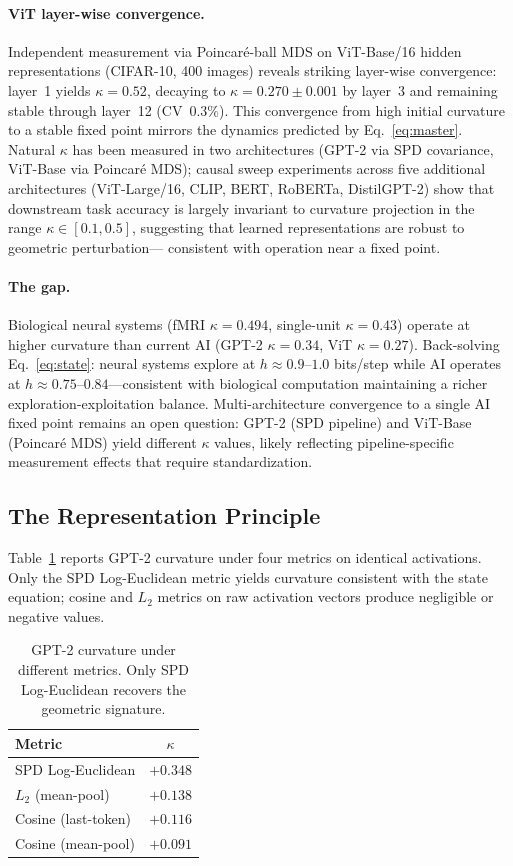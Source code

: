 \documentclass[letterpaper]{article}
\begin{document}
\paragraph{ViT layer-wise convergence.}
Independent measurement via Poincar\'{e}-ball MDS on
ViT-Base/16 hidden representations (CIFAR-10, 400
images) reveals striking layer-wise convergence:
layer~1 yields $\kappa=0.52$, decaying to
$\kappa=0.270\pm0.001$ by layer~3 and remaining
stable through layer~12 (CV~$0.3\%$).
This convergence from high initial curvature to a
stable fixed point mirrors the dynamics predicted by
Eq.~\eqref{eq:master}.
Natural $\kappa$ has been measured in two architectures
(GPT-2 via SPD covariance, ViT-Base via Poincar\'{e}
MDS); causal sweep experiments across five additional
architectures (ViT-Large/16, CLIP, BERT, RoBERTa,
DistilGPT-2) show that downstream task accuracy
is largely invariant to curvature projection in the
range $\kappa\in[0.1, 0.5]$, suggesting that learned
representations are robust to geometric perturbation---
consistent with operation near a fixed point.

\paragraph{The gap.}
Biological neural systems (fMRI $\kappa=0.494$,
single-unit $\kappa=0.43$) operate at
higher curvature than current AI
(GPT-2 $\kappa=0.34$, ViT $\kappa=0.27$).
Back-solving Eq.~\eqref{eq:state}: neural systems
explore at $h\approx0.9$--$1.0$ bits/step while AI
operates at $h\approx0.75$--$0.84$---consistent with
biological computation maintaining a richer
exploration-exploitation balance.
Multi-architecture convergence to a single AI fixed
point remains an open question: GPT-2 (SPD pipeline)
and ViT-Base (Poincar\'{e} MDS) yield different
$\kappa$ values, likely reflecting pipeline-specific
measurement effects that require standardization.

\subsection{The Representation Principle}

Table~\ref{tab:metric} reports GPT-2 curvature under
four metrics on identical activations.
Only the SPD Log-Euclidean metric yields curvature
consistent with the state equation; cosine and $L_2$
metrics on raw activation vectors produce negligible or
negative values.

\begin{table}[t]
\centering
\caption{GPT-2 curvature under different metrics.
  Only SPD Log-Euclidean recovers the geometric
  signature.}
\label{tab:metric}
\smallskip
\begin{tabular}{@{}lc@{}}
\toprule
\textbf{Metric} & $\kappa$ \\
\midrule
SPD Log-Euclidean        & $+0.348$ \\
$L_2$ (mean-pool)        & $+0.138$ \\
Cosine (last-token)      & $+0.116$ \\
Cosine (mean-pool)       & $+0.091$ \\
\bottomrule
\end{tabular}
\end{table}
\end{document}
